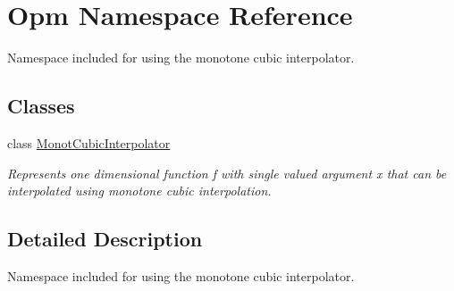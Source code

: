 \hypertarget{namespace_opm}{}\section{Opm Namespace Reference}
\label{namespace_opm}


Namespace included for using the monotone cubic interpolator.  


\subsection*{Classes}
\begin{DoxyCompactItemize}
\item 
class \hyperlink{class_opm_1_1_monot_cubic_interpolator}{Monot\+Cubic\+Interpolator}
\begin{DoxyCompactList}\small\item\em Represents one dimensional function f with single valued argument x that can be interpolated using monotone cubic interpolation. \end{DoxyCompactList}\end{DoxyCompactItemize}


\subsection{Detailed Description}
Namespace included for using the monotone cubic interpolator. 